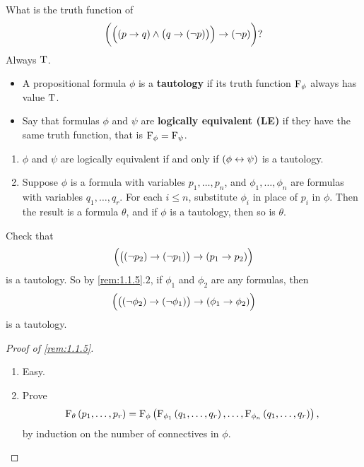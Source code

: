 
\begin{example*}
What is the truth function of
$$ \impb{\andb{\impb{p}{q}}{\impb{q}{\notb{p}}}}{\notb{p}}? $$
Always $ \mathrm{T} $.
\end{example*}

\begin{definition}
\hfill
\begin{itemize}
\item A propositional formula $ \phi $ is a \textbf{tautology} if its truth function $ \mathrm{F}_\phi $ always has value $ \mathrm{T} $.
\item Say that formulas $ \phi $ and $ \psi $ are \textbf{logically equivalent (LE)} if they have the same truth function, that is $ \mathrm{F}_\phi = \mathrm{F}_\psi $.
\end{itemize}
\end{definition}

\begin{remark}
\label{rem:1.1.5}
\hfill
\begin{enumerate}
\item $ \phi $ and $ \psi $ are logically equivalent if and only if $ \iffb{\phi}{\psi} $ is a tautology.
\item Suppose $ \phi $ is a formula with variables $ p_1, \dots, p_n $, and $ \phi_1, \dots, \phi_n $ are formulas with variables $ q_1, \dots, q_r $. For each $ i \le n $, substitute $ \phi_i $ in place of $ p_i $ in $ \phi $. Then the result is a formula $ \theta $, and if $ \phi $ is a tautology, then so is $ \theta $.
\end{enumerate}
\end{remark}

\pagebreak

\begin{example}
Check that
$$ \impb{\impb{\notb{p_2}}{\notb{p_1}}}{\impb{p_1}{p_2}} $$
is a tautology. So by \ref{rem:1.1.5}.$ 2 $, if $ \phi_1 $ and $ \phi_2 $ are any formulas, then
$$ \impb{\impb{\notb{\phi_2}}{\notb{\phi_1}}}{\impb{\phi_1}{\phi_2}} $$
is a tautology.
\end{example}

\begin{proof}[Proof of \ref{rem:1.1.5}]
\hfill
\begin{enumerate}
\item Easy.
\item Prove
$$ \F_\theta\br{p_1, \dots, p_r} = \F_\phi\br{\F_{\phi_1}\br{q_1, \dots, q_r}, \dots, \F_{\phi_n}\br{q_1, \dots, q_r}}, $$
by induction on the number of connectives in $ \phi $.
\end{enumerate}
\end{proof}

